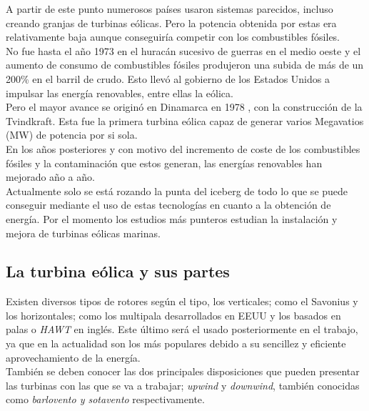 A partir de este punto numerosos países usaron sistemas parecidos, incluso creando granjas de turbinas eólicas. Pero la potencia obtenida por estas era relativamente baja aunque conseguiría competir con los combustibles fósiles.\\

No fue hasta el año 1973 \cite{1973crisis} en el huracán sucesivo de guerras en el medio oeste y el aumento de consumo de combustibles fósiles produjeron  una subida de más de un 200\% en el barril de crudo. Esto llevó al gobierno de los Estados Unidos a impulsar las energía renovables, entre ellas la eólica.\\

Pero el mayor avance se originó en Dinamarca en 1978 \cite{turbinaDanesa}, con la construcción de la Tvindkraft. Esta fue la primera turbina eólica capaz de generar varios Megavatios (MW) de potencia por si sola.\\

En los años posteriores y con motivo del incremento de coste de los combustibles fósiles y la contaminación que estos generan, las energías renovables han mejorado año a año.\\

Actualmente solo se está rozando la punta del iceberg de todo lo que se puede conseguir mediante el uso de estas tecnologías en cuanto a la obtención de energía. Por el momento los estudios más punteros estudian la instalación y mejora de turbinas eólicas marinas.\\




\subsection{La turbina eólica y sus partes}

Existen diversos tipos de rotores según el tipo, los verticales; como el Savonius y los horizontales; como los multipala desarrollados en EEUU y los basados en palas o \textit{HAWT} en inglés. Este último será el usado posteriormente en el trabajo, ya que en la actualidad son los más populares debido a su sencillez y eficiente aprovechamiento de la energía.\\

También se deben conocer las dos principales disposiciones que pueden presentar las turbinas con las que se va a trabajar; \textit{upwind} y \textit{downwind}, también conocidas como \textit{barlovento y sotavento} respectivamente. \\

